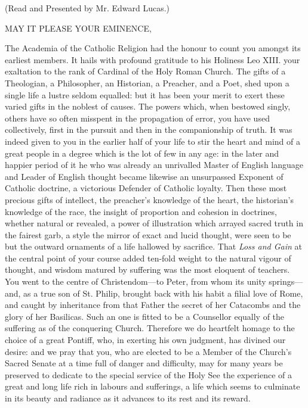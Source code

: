 
(Read and Presented by Mr. Edward Lucas.)

MAY IT PLEASE
YOUR EMINENCE,

The Academia of the Catholic Religion had the honour to count you
amongst its earliest members. It hails with profound gratitude to his
Holiness Leo XIII. your exaltation to the rank of Cardinal of
the Holy Roman Church. The gifts of a Theologian, a Philosopher, an
Historian, a Preacher, and a Poet, shed upon a single life a lustre
seldom equalled: but it has been your merit to exert these varied
gifts in the noblest of causes. The powers which, when bestowed
singly, others have so often misspent in the propagation of error, you
have used collectively, first in the pursuit and then in the
companionship of truth. It was indeed given to you in the earlier half
of your life to stir the heart and mind of a great people in a degree
which is the lot of few in any age: in the later and happier period of
it he who was already an unrivalled Master of English language and
Leader of English thought became likewise an unsurpassed Exponent of
Catholic doctrine, a victorious Defender of Catholic loyalty. Then
these most precious gifts of intellect, the preacher's knowledge of
the heart, the historian's knowledge of the race, the insight of
proportion and cohesion in doctrines, whether natural or revealed, a
power of illustration which arrayed sacred truth in the fairest garb,
a style the mirror of exact and lucid thought, were seen to be but the
outward ornaments of a life hallowed by sacrifice. That \emph{Loss and
Gain} at the central point of your course added ten-fold weight to
the natural vigour of thought, and wisdom matured by suffering was the
most eloquent of teachers. You went to the centre of Christendom—to
Peter, from whom its unity springs—and, as a true son of St. Philip,
brought back with his habit a filial love of Rome, and caught by
inheritance from that Father the secret of her Catacombs and the glory
of her Basilicas. Such an one is fitted to be a Counsellor equally of
the suffering as of the conquering Church. Therefore we do heartfelt
homage to the choice of a great Pontiff, who, in exerting his own
judgment, has divined our desire: and we pray that you, who are
elected to be a Member of the Church's Sacred Senate at a time full of
danger and difficulty, may for many years be preserved to dedicate to
the special service of the Holy See the experience of a great and long
life rich in labours and sufferings, a life which seems to culminate
in its beauty and radiance as it advances to its rest and its reward.


